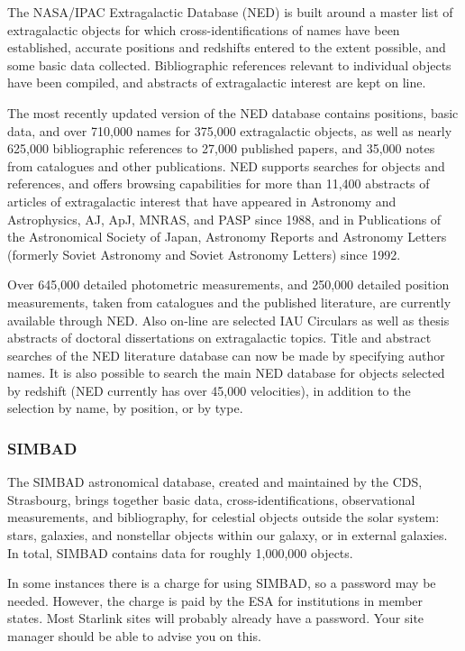 \documentclass[twoside,11pt]{article}
\newcommand{\htmladdnormallink}[2]{#1}
\newcommand{\xlabel}[1]{}
\newcommand{\STARLINKref}{\htmladdnormallink{Starlink}{http://www.starlink.ac.uk/}}
\newcommand{\SIMBADref}{\htmladdnormallink{SIMBAD}{http://cdsweb.u-strasbg.fr/Simbad.html}}
\newcommand{\NEDref}{\htmladdnormallink{NED}{http://ds.internic.net/cgi-bin/enthtml/database/ned.b}}
\begin{document}
The NASA/IPAC Extragalactic Database ({\NEDref}) is built around a master list of
extragalactic objects for which cross-identifications of names have been
established, accurate positions and redshifts entered to the extent possible,
and some basic data collected. Bibliographic references relevant to
individual objects have been compiled, and abstracts of extragalactic
interest are kept on line.

The most recently updated version of the NED database contains positions,
basic data, and over 710,000 names for 375,000 extragalactic objects, as well
as nearly 625,000 bibliographic references to 27,000 published papers, and
35,000 notes from catalogues and other publications. NED supports searches for
objects and references, and offers browsing capabilities for more than 11,400
abstracts of articles of extragalactic interest that have appeared in
Astronomy and Astrophysics, AJ, ApJ, MNRAS, and PASP since 1988, and in
Publications of the Astronomical Society of Japan, Astronomy Reports and
Astronomy Letters (formerly Soviet Astronomy and Soviet Astronomy Letters)
since 1992.

Over 645,000 detailed photometric measurements, and 250,000 detailed position
measurements, taken from catalogues and the published literature, are currently
available through NED. Also on-line are selected IAU Circulars as well as
thesis abstracts of doctoral dissertations on extragalactic topics. Title and
abstract searches of the NED literature database can now be made by
specifying author names. It is also possible to search the main NED database
for objects selected by redshift ({\NEDref} currently has over 45,000 velocities),
in addition to the selection by name, by position, or by type.

\subsubsection{{\SIMBADref}} \xlabel{SIMBAD}
\label{sec:simbad}

The {\SIMBADref} astronomical database, created and maintained by the CDS,
Strasbourg, brings together basic data, cross-identifications, observational
measurements, and bibliography, for celestial objects outside the solar
system: stars, galaxies, and nonstellar objects within our galaxy, or in
external galaxies. In total, SIMBAD contains data for roughly
1,000,000 objects.

In some instances there is a charge for using SIMBAD, so a password may be needed.
However, the charge is paid by the ESA for institutions in member states. Most
{\STARLINKref} sites will probably already have a password. Your site manager
should be able to advise you on this.
\end{document}
